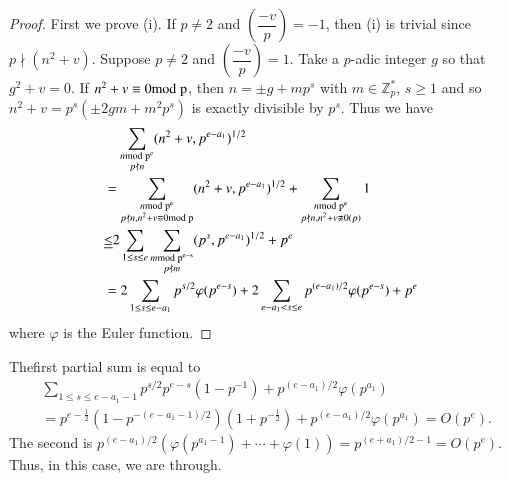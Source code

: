 \begin{proof}
First we prove (i). If $p\neq 2$ and $\left(\dfrac{-v}{p}\right)=-1$, then
(i) is trivial since $p\nmid (n^{2}+v)$. Suppose $p\neq 2$ and
$\left(\dfrac{-v}{p}\right)=1$. Take a $p$-adic integer $g$ so that
$g^{2}+v=0$. If $n^{2}+v\equiv 0\rm{mod} \; p$, then $n=\pm g+mp^{s}$ with
$m\in\mathbb{Z}^{\ast}_{p}$, $s\geq 1$ and so $n^{2}+v=p^{s}(\pm
2gm+m^{2}p^{s})$ is exactly divisible by $p^{s}$. Thus we have
\begin{align*}
&\quad \sum_{\substack{n\rm{mod} \; p^{e}\\ p\nmid n}}(n^{2}+v,
  p^{e-a_{1}})^{1/2}\\
&= \sum_{\substack{n\rm{mod} \; p^{e}\\ p\nmid n, n^{2}+v\equiv 0\rm{mod} \; p}}
  (n^{2}+v, p^{e-a_{1}})^{1/2}+\sum_{\substack{n\rm{mod} \; p^{e}\\ p\nmid
      n,n^{2}+v\not\equiv 0(p)}}1\\
&\underline{\leq} 2\sum_{1\leq s\leq e} \sum_{\substack{m\rm{mod} \;
      p^{e-s}\\ p\nmid m}}(p^{s}, p^{e-a_{1}})^{1/2}+p^{e}\\
&= 2\sum_{1\leq s\leq
    e-a_{1}}p^{s/2}\varphi(p^{e-s})+2\sum_{e-a_{1}<s\leq
    e}p^{(e-a_{1})/2}\varphi(p^{e-s})+p^{e} 
\end{align*}
where $\varphi$ is the Euler function.
\end{proof}

The\pageoriginale first partial sum is equal to
\begin{align*}
& \sum_{1\leq s\leq
  e-a_{1}-1}p^{s/2}p^{e-s}(1-p^{-1})+p^{(e-a_{1})/2}\varphi(p^{a_{1}})\\
&=
  p^{e-\frac{1}{2}}(1-p^{-(e-a_{1}-1)/2})(1+p^{-\frac{1}{2}})+p^{(e-a_{1})/2}\varphi(p^{a_{1}})=O(p^{e}). 
\end{align*}
The second is
$p^{(e-a_{1})/2}(\varphi(p^{a_{1}-1})+\cdots+\varphi(1))=p^{(e+a_{1})/2-1}=O(p^{e})$. Thus,
in this case, we are through.

